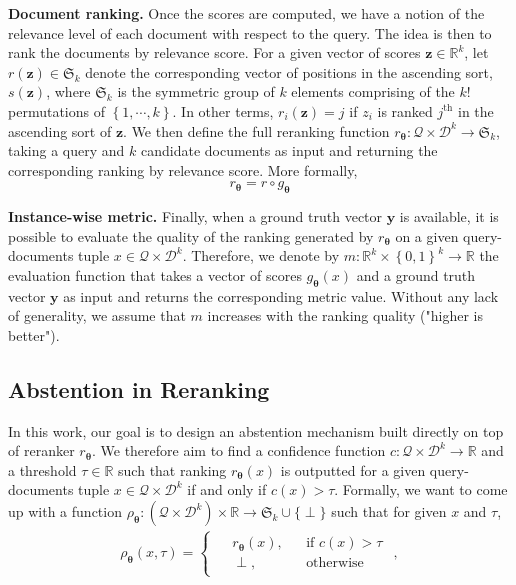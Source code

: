 \noindent \textbf{Document ranking.} Once the scores are computed, we have a notion of the relevance level of each document with respect to the query. The idea is then to rank the documents by relevance score. For a given vector of scores $\mathbf{z} \in \mathbb{R}^k$, let $r(\mathbf{z}) \in \mathfrak{S}_k$ denote the corresponding vector of positions in the ascending sort, $s(\mathbf{z})$, where $\mathfrak{S}_k$ is the symmetric group of $k$ elements comprising of the $k!$ permutations of $\left\{1, \cdots, k \right\}$. In other terms, $r_i(\mathbf{z}) = j$ if $z_i$ is ranked $j^{\text{th}}$ in the ascending sort of $\mathbf{z}$. We then define the full reranking function $r_{\bm{\theta}} : \mathcal{Q} \times \mathcal{D}^k \rightarrow \mathfrak{S}_k$, taking a query and $k$ candidate documents as input and returning the corresponding ranking by relevance score. More formally, 
\begin{equation}\label{eq:r_theta}
r_{\bm{\theta}} = r \circ g_{\bm{\theta}}
\end{equation}

\noindent \textbf{Instance-wise metric.} Finally, when a ground truth vector $\mathbf{y}$ is available, it is possible to evaluate the quality of the ranking generated by $r_{\bm{\theta}}$ on a given query-documents tuple $x \in \mathcal{Q} \times \mathcal{D}^k$. Therefore, we denote by $m : \mathbb{R}^k \times \left\{ 0,1 \right\}^k \rightarrow \mathbb{R}$ the evaluation function that takes a vector of scores $g_{\bm{\theta}}(x)$ and a ground truth vector $\mathbf{y}$ as input and returns the corresponding metric value.
Without any lack of generality, we assume that $m$ increases with the ranking quality ("higher is better").

\subsection{Abstention in Reranking}
\label{sec:abst_pb}

In this work, our goal is to design an abstention mechanism built directly on top of reranker $r_{\bm{\theta}}$. We therefore aim to find a confidence function $c : \mathcal{Q} \times \mathcal{D}^k \rightarrow \mathbb{R}$ and a threshold $\tau \in \mathbb{R}$ such that ranking $r_{\bm{\theta}}(x)$ is outputted for a given query-documents tuple $x\in \mathcal{Q} \times \mathcal{D}^k$ if and only if $c(x) > \tau$.  Formally, we want to come up with a function $\rho_{\bm{\theta}} : \left( \mathcal{Q} \times \mathcal{D}^k \right) \times \mathbb{R} \rightarrow \mathfrak{S}_k \cup \{ \perp \}$ such that for given $x$ and $\tau$,
\begin{equation}\label{eq:abst_mecha}
\begin{split}
    \rho_{\bm{\theta}}(x, \tau) = \begin{cases}
        \begin{aligned}
            &r_{\bm{\theta}}(x), && \text{if } c(x) > \tau \\
            &\perp, && \text{otherwise}
        \end{aligned}
    \end{cases},
\end{split}
\end{equation}

